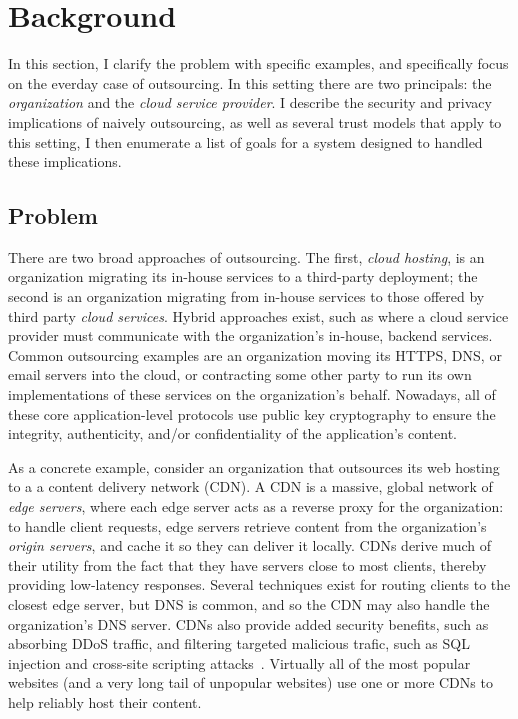 \section{Background}
\label{sec:background}

In this section, I clarify the problem with specific examples, and specifically
focus on the everday case of outsourcing.
%
%
In this setting there are two principals: the \emph{organization} and the
\emph{cloud service provider}.
%
I describe the security and privacy implications of naively outsourcing, as
well as several trust models that apply to this setting, 
%
I then enumerate a list of goals for a system designed to handled these
implications.


\subsection{Problem}

There are two broad approaches of outsourcing.
%
The first, \emph{cloud hosting}, is an organization migrating its in-house
services to a third-party deployment; the second is an organization  migrating
from in-house services to those offered by third party \emph{cloud services}.
%
Hybrid approaches exist, such as where a cloud service provider must
communicate with the organization's in-house, backend services.
%
Common outsourcing examples are an organization moving its HTTPS, DNS, or
email servers into the cloud, or contracting some other party to run its own
implementations of these services on the organization's behalf.
%
Nowadays, all of these core application-level protocols use public key
cryptography to ensure the integrity, authenticity, and/or confidentiality of
the application's content.


As a concrete example, consider an organization that outsources its web hosting
to a a content delivery network (CDN)\@.
%
A CDN is a massive, global network of \emph{edge servers}, where each edge
server acts as a reverse proxy for the organization: to
handle client requests, edge servers retrieve content from the organization's
\emph{origin servers}, and cache it so they can deliver it locally.
%
CDNs derive much of their utility from the fact that they have servers close to
most clients, thereby providing low-latency responses.
%
Several techniques exist for routing clients to the closest edge server, but
DNS is common, and so the CDN may also handle the organization's DNS server.
%
CDNs also provide added security benefits, such as absorbing DDoS
traffic, and filtering targeted malicious trafic, such as SQL injection and
cross-site scripting attacks~\cite{securing-cdns}.
%
Virtually all of the most popular websites (and a very long tail of unpopular
websites) use one or more CDNs to help reliably host their content.


